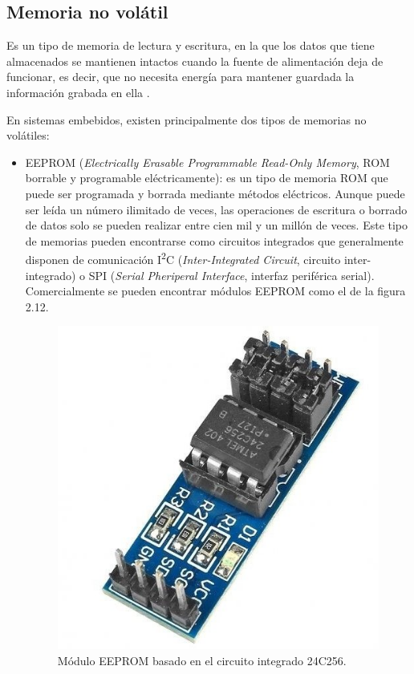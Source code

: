 \subsection{Memoria no volátil}

Es un tipo de memoria de lectura y escritura, en la que los datos que tiene almacenados se mantienen intactos cuando la fuente de alimentación deja de funcionar, es decir, que no necesita energía para mantener guardada la información grabada en ella \citep{BOOK:3}.

En sistemas embebidos, existen principalmente dos tipos de memorias no volátiles:

\begin{itemize}
	\item EEPROM (\textit{Electrically Erasable Programmable Read-Only Memory}, ROM borrable y programable eléctricamente): es un tipo de memoria ROM que puede ser programada y borrada mediante métodos eléctricos. Aunque puede ser leída un número ilimitado de veces, las operaciones de escritura o borrado de datos solo se pueden realizar entre cien mil y un millón de veces. Este tipo de memorias pueden encontrarse como circuitos integrados que generalmente disponen de comunicación I\textsuperscript{2}C (\textit{Inter-Integrated Circuit}, circuito inter-integrado) o SPI (\textit{Serial Pheriperal Interface}, interfaz periférica serial). Comercialmente se pueden encontrar módulos EEPROM como el de la figura 2.12.
	\begin{figure}[h]
		\centering
		\includegraphics[scale=0.26]{./Figures/eeprom.jpg}
		\caption{Módulo EEPROM basado en el circuito integrado 24C256\protect\footnotemark.}
		\label{fig:cuadradoAzul}
	\end{figure}


\end{itemize}
